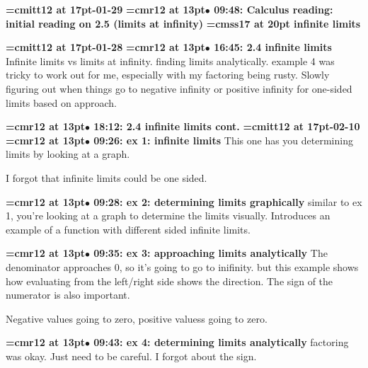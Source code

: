 {\medskip\noindent\bf\font\titlefont=cmitt12 at 17pt-01-29}\medskip
{\smallskip\noindent\bf\font\titlefont=cmr12 at 13pt\titlefont $\bullet$ 09:48: Calculus reading: initial reading on 2.5 (limits at infinity)}\smallskip
{}
{\medskip\noindent\bf\font\titlefont=cmss17 at 20pt infinite limits}\medskip

{\medskip\noindent\bf\font\titlefont=cmitt12 at 17pt-01-28}\medskip
{\smallskip\noindent\bf\font\titlefont=cmr12 at 13pt\titlefont $\bullet$ 16:45: 2.4 infinite limits}\smallskip
Infinite limits vs limits at infinity. finding limits analytically. example 4 was tricky to work out for me, especially with my factoring being rusty. Slowly figuring out when things go to negative infinity or positive infinity for one-sided limits based on approach.
\par

{\smallskip\noindent\bf\font\titlefont=cmr12 at 13pt\titlefont $\bullet$ 18:12: 2.4 infinite limits cont.}\smallskip
{\medskip\noindent\bf\font\titlefont=cmitt12 at 17pt-02-10}\medskip
{\smallskip\noindent\bf\font\titlefont=cmr12 at 13pt\titlefont $\bullet$ 09:26: ex 1: infinite limits}\smallskip
This one has you determining limits by looking at a graph.
\par

I forgot that infinite limits could be one sided.
\par

{\smallskip\noindent\bf\font\titlefont=cmr12 at 13pt\titlefont $\bullet$ 09:28: ex 2: determining limits graphically}\smallskip
similar to ex 1, you're looking at a graph to determine the limits visually. Introduces an example of a function with different sided infinite limits.
\par

{\smallskip\noindent\bf\font\titlefont=cmr12 at 13pt\titlefont $\bullet$ 09:35: ex 3: approaching limits analytically}\smallskip
The denominator approaches 0, so it's going to go to inifinity. but this example shows how evaluating from the left/right side shows the direction. The sign of the numerator is also important.
\par

Negative values going to zero, positive valuess going to zero.
\par

{\smallskip\noindent\bf\font\titlefont=cmr12 at 13pt\titlefont $\bullet$ 09:43: ex 4: determining limits analytically}\smallskip
factoring was okay. Just need to be careful. I forgot about the sign.
\par

